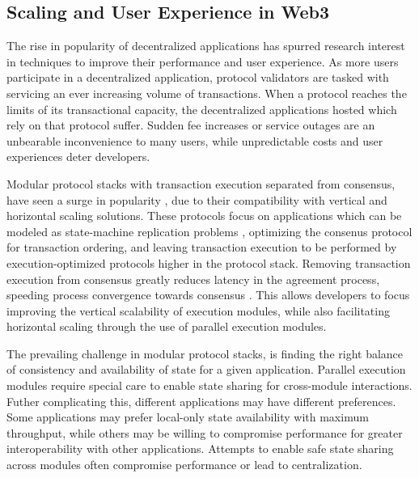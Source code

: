 \documentclass[12pt]{article}
\begin{document}
\subsection{Scaling and User Experience in Web3}
  The rise in popularity of decentralized applications has spurred research
  interest in techniques to improve their performance and user experience. As
  more users participate in a decentralized application, protocol validators
  are tasked with servicing an ever increasing volume of transactions. When a
  protocol reaches the limits of its transactional capacity, the decentralized
  applications hosted which rely on that protocol suffer. Sudden fee increases
  \cite{CryptoKitties, al2021cryptocurrency, katsiampa2019empirical,
  saef2023regime} or service outages \cite{SolanaRestart} are an unbearable
  inconvenience to many users, while unpredictable costs and user experiences
  deter developers.

  Modular protocol stacks with transaction execution separated from consensus,
  have seen a surge in popularity \cite{LazyLedger, avail}, due to their
  compatibility with vertical and horizontal scaling solutions. These protocols
  focus on applications which can be modeled as state-machine replication
  problems \cite{schneider1990}, optimizing the consenus protocol for
  transaction ordering, and leaving transaction execution to be performed by
  execution-optimized protocols higher in the protocol stack. Removing
  transaction execution from consensus greatly reduces latency in the agreement
  process, speeding process convergence towards consensus
  \cite{wan2019evaluating}. This allows developers to focus improving the
  vertical scalability of execution modules, while also facilitating horizontal
  scaling through the use of parallel execution modules.

  The prevailing challenge in modular protocol stacks, is finding the right
  balance of consistency and availability of state for a given application.
  Parallel execution modules require special care to enable state sharing for
  cross-module interactions. Futher complicating this, different applications
  may have different preferences. Some applications may prefer local-only state
  availability with maximum throughput, while others may be willing to
  compromise performance for greater interoperability with other applications.
  Attempts to enable safe state sharing across modules often compromise
  performance or lead to centralization.
\end{document}
